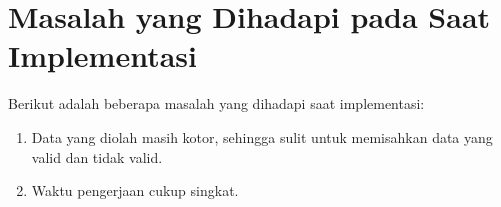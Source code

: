 \section{Masalah yang Dihadapi pada Saat Implementasi}
Berikut adalah beberapa masalah yang dihadapi saat implementasi:
\begin{enumerate}
	\item Data yang diolah masih kotor, sehingga sulit untuk memisahkan data yang valid dan tidak valid.
	\item Waktu pengerjaan cukup singkat.
\end{enumerate}






